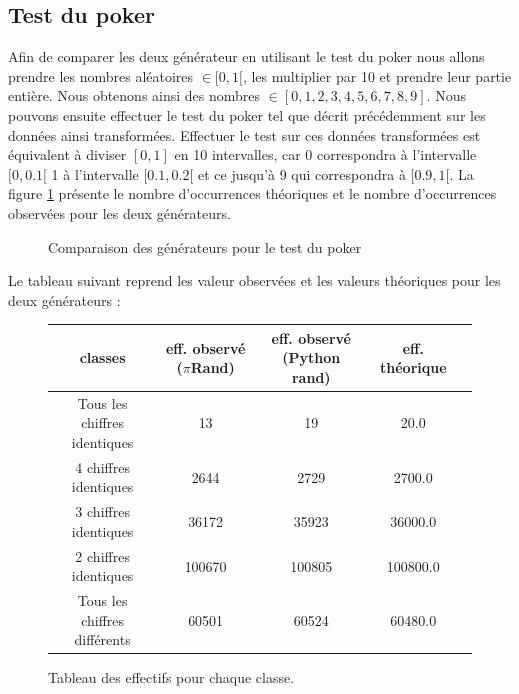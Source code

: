 \documentclass[10pt,a4paper]{article}
\begin{document}
\subsection{Test du poker}
Afin de comparer les deux générateur en utilisant le test du poker nous allons prendre les nombres aléatoires $\in [0,1[$, les multiplier par 10 et prendre leur partie entière. Nous obtenons ainsi des nombres $\in [0,1,2,3,4,5,6,7,8,9]$. Nous pouvons ensuite effectuer le test du poker tel que décrit précédemment sur les données ainsi transformées. Effectuer le test sur ces données transformées est équivalent à diviser $[0,1]$ en 10 intervalles, car 0 correspondra à l'intervalle $[0,0.1[$ 1 à l'intervalle $[0.1,0.2[$ et ce jusqu'à 9 qui correspondra à $[0.9,1[$.\newline \newline
La figure \ref{poker_generator_histogram} présente le nombre d'occurrences théoriques et le nombre d'occurrences observées pour les deux générateurs.

\begin{figure}[H]
\caption{Comparaison des générateurs pour le test du poker}
\label{poker_generator_histogram}
\end{figure}
Le tableau suivant reprend les valeur observées et les valeurs théoriques pour les deux générateurs :
\begin{figure}[H]
\begin{center}
\begin{longtable}{|c|c|c|c|c|}
\hline
classes & eff. observé ($\pi$Rand) & eff. observé (Python rand) & eff. théorique\\
\hline
Tous les chiffres identiques & 13 & 19 & 20.0 \\
4 chiffres identiques & 2644 & 2729 & 2700.0 \\
3 chiffres identiques  & 36172 & 35923 & 36000.0\\
2 chiffres identiques & 100670 & 100805 & 100800.0\\
Tous les chiffres différents & 60501 & 60524 & 60480.0\\
\hline
\end{longtable}
\end{center}
\caption{Tableau des effectifs pour chaque classe.}
\end{figure}
\end{document}
